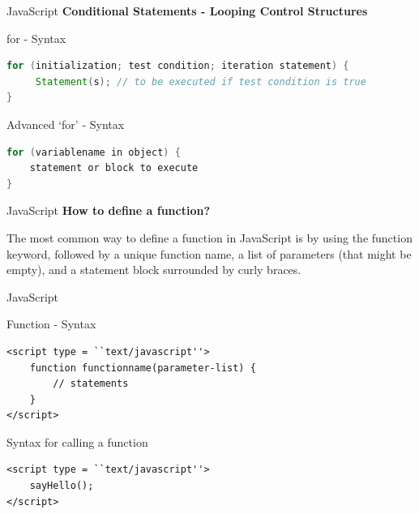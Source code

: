 \documentclass[14pt]{beamer}
\begin{document}
\begin{frame}[fragile]{JavaScript}
\textbf{Conditional Statements - Looping Control Structures}

\vspace{1pc}
\begin{block}{for - Syntax}
\begin{lstlisting}[language=java]
for (initialization; test condition; iteration statement) {
     Statement(s); // to be executed if test condition is true
}
\end{lstlisting}
\end{block}

\begin{block}{Advanced `for' - Syntax}
\begin{lstlisting}[language=java]
for (variablename in object) {
    statement or block to execute
}
\end{lstlisting}
\end{block}
\end{frame}

\begin{frame}[fragile]{JavaScript}
\textbf{How to define a function?}

\vspace{1pc}
The most common way to define a function in JavaScript is by using the function keyword, followed by a unique function name, a list of parameters (that might be empty), and a statement block surrounded by curly braces.
\end{frame}

\begin{frame}[fragile]{JavaScript}
\begin{block}{Function - Syntax}
\begin{lstlisting}
<script type = ``text/javascript''>
    function functionname(parameter-list) {
        // statements
    }
</script>
\end{lstlisting}
\end{block}

\begin{block}{Syntax for calling a function}
\begin{lstlisting}
<script type = ``text/javascript''>
    sayHello();
</script>
\end{lstlisting}
\end{block}
\end{frame}
\end{document}
